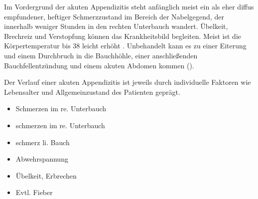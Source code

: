 {%
Im Vordergrund der akuten Appendizitis
steht anfänglich meist ein als eher diffus empfundener, heftiger Schmerzzustand im Bereich der
Nabelgegend, der
innerhalb weniger Stunden in den rechten Unterbauch
wandert. Übelkeit, Brechreiz und Verstopfung
 können das Krankheitsbild begleiten. Meist ist die Körpertemperatur bis 38\DegC{} leicht erhöht
. 
 Unbehandelt kann es zu einer
Eiterung und einem Durchbruch in die Bauchhöhle, einer
anschließenden Bauchfellentzündung und einem akuten Abdomen
kommen ().

Der Verlauf einer akuten Appendizitis ist
jeweils durch individuelle Faktoren wie Lebensalter und Allgemeinzustand des
Patienten geprägt. 
}{
\begin{itemize}
  \item Schmerzen im re. Unterbauch
  \item {}schmerzen im re. Unterbauch
  \item {}schmerz li. Bauch
  \item Abwehrspannung
  \item Übelkeit, Erbrechen
  \item Evtl. Fieber
\end{itemize}
}{}{}{}



% 
% 



